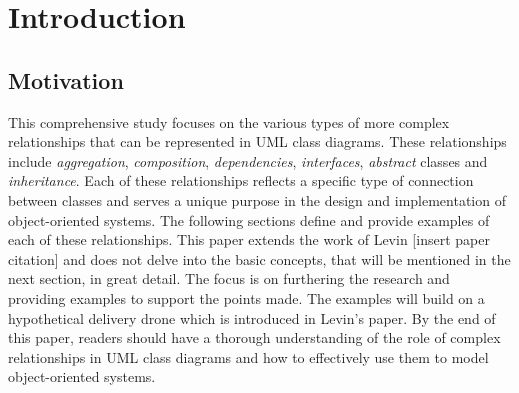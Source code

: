 \documentclass[
	12pt,
    a4paper,
    egregdoesnotlikesansseriftitles, %
    toc=chapterentrywithdots,
    oneside, openany,
    titlepage,
    parskip=half,
    headings=normal,  %
    listof=totoc,
    bibliography=totoc,
    index=totoc,
    captions=tableheading,  %
    listof=flat,
    numbers=noenddot, %
    final]
    {scrbook}
\begin{document}
\setcounter{secnumdepth}{3}  %
\setcounter{tocdepth}{2}  %


\frontmatter


\tableofcontents

\listoffigures
\clearpage %

\listoftables
\clearpage %

\renewcommand{\lstlistlistingname}{List of Listings}  %
\lstlistoflistings
\clearpage %

\mainmatter

\chapter{Introduction}

\section{Motivation}
This comprehensive study focuses on the various types of more complex relationships that can be represented in UML class diagrams. 
These relationships include \emph{aggregation}, \emph{composition}, \emph{dependencies}, \emph{interfaces}, \emph{abstract} classes and \emph{inheritance}. 
Each of these relationships reflects a specific type of connection between classes and serves a unique purpose in the design and implementation of object-oriented systems. 
The following sections define and provide examples of each of these relationships.
This paper extends the work of Levin [insert paper citation] and does not delve into the basic concepts, that will be mentioned in the next section, in great detail. 
The focus is on furthering the research and providing examples to support the points made.
The examples will build on a hypothetical delivery drone which is introduced in Levin's paper.
By the end of this paper, readers should have a thorough understanding of the role of complex relationships in UML class diagrams and how to effectively use them to model object-oriented systems.

\end{document}
